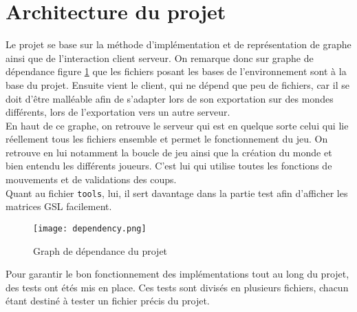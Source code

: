 \section{Architecture du projet}

Le projet se base sur la méthode d'implémentation et de représentation de graphe ainsi que de l'interaction client serveur. On remarque donc sur graphe de dépendance figure \ref{fig:my_label} que les fichiers posant les bases de l'environnement sont à la base du projet. Ensuite vient le client, qui ne dépend que peu de fichiers, car il se doit d'être malléable afin de s'adapter lors de son exportation sur des mondes différents, lors de l'exportation vers un autre serveur. \\
En haut de ce graphe, on retrouve le serveur qui est en quelque sorte celui qui lie réellement tous les fichiers ensemble et permet le fonctionnement du jeu. On retrouve en lui notamment la boucle de jeu ainsi que la création du monde et bien entendu les différents joueurs. C'est lui qui utilise toutes les fonctions de mouvements et de validations des coups. \\
Quant au fichier \texttt{tools}, lui, il sert davantage dans la partie test afin d'afficher les matrices GSL facilement.

\medbreak

\begin{figure}[H]
    \centering
    \texttt{[image: dependency.png]}
    \caption{Graph de dépendance du projet}
    \label{fig:my_label}
\end{figure}

\medbreak

Pour garantir le bon fonctionnement des implémentations tout au long du projet, des tests ont étés mis en place. Ces tests sont divisés en plusieurs fichiers, chacun étant destiné à tester un fichier précis du projet.